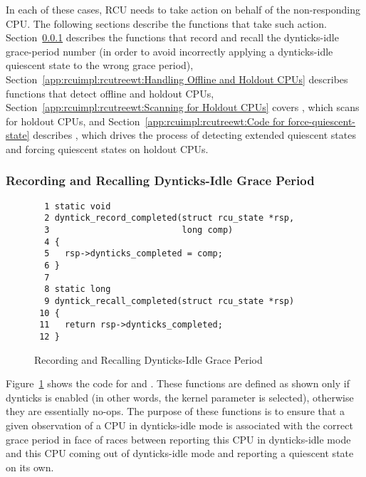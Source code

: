In each of these cases, RCU needs to take action on behalf of the
non-responding CPU.
The following sections describe the functions that take such action.
Section~\ref{app:rcuimpl:rcutreewt:Recording and Recalling Dynticks-Idle Grace Period}
describes the functions that record and recall the dynticks-idle
grace-period number (in order to avoid incorrectly applying a dynticks-idle
quiescent state to the wrong grace period),
Section~\ref{app:rcuimpl:rcutreewt:Handling Offline and Holdout CPUs}
describes functions that detect offline and holdout CPUs,
Section~\ref{app:rcuimpl:rcutreewt:Scanning for Holdout CPUs}
covers , which scans for holdout CPUs, and
Section~\ref{app:rcuimpl:rcutreewt:Code for force-quiescent-state}
describes , which drives the process of
detecting extended quiescent states and forcing quiescent states on
holdout CPUs.

\subsubsection{Recording and Recalling Dynticks-Idle Grace Period}
\label{app:rcuimpl:rcutreewt:Recording and Recalling Dynticks-Idle Grace Period}

\begin{figure}[tbp]
{ \scriptsize
\begin{verbatim}
  1 static void
  2 dyntick_record_completed(struct rcu_state *rsp,
  3                          long comp)
  4 {
  5   rsp->dynticks_completed = comp;
  6 }
  7
  8 static long
  9 dyntick_recall_completed(struct rcu_state *rsp)
 10 {
 11   return rsp->dynticks_completed;
 12 }
\end{verbatim}
}
\caption{Recording and Recalling Dynticks-Idle Grace Period}
\label{fig:app:rcuimpl:rcutreewt:Recording and Recalling Dynticks-Idle Grace Period}
\end{figure}

Figure~\ref{fig:app:rcuimpl:rcutreewt:Recording and Recalling Dynticks-Idle Grace Period}
shows the code for  and
.
These functions are defined as shown only if dynticks
is enabled (in other words, the  kernel parameter
is selected), otherwise they are essentially no-ops.
The purpose of these functions is to ensure that a given observation
of a CPU in dynticks-idle mode is associated with the correct
grace period in face of races between reporting this CPU in
dynticks-idle mode and this CPU coming out of dynticks-idle mode
and reporting a quiescent state on its own.

